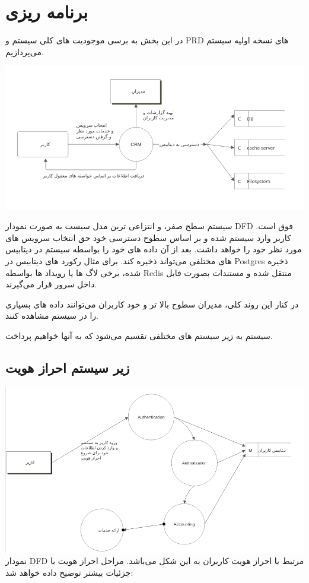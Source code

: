 \section{برنامه ریزی}
در این بخش به برسی موجودیت های کلی سیستم و PRD های نسخه اولیه سیستم می‌پردازیم.

\includegraphics[scale=0.8]{assets/0_level_system.png}

سیستم سطح صفر، و انتزاعی ترین مدل سیست به صورت نمودار DFD فوق است.
کاربر وارد سیستم شده و بر اساس سطوح دسترسی خود حق انتخاب سرویس های مورد نظر خود را خواهد داشت. بعد از آن
داده های خود را بواسطه سیستم در دیتابیس های مختلفی می‌تواند ذخیره کند.
برای مثال رکورد های دیتابیس در Postgres ذخیره شده، برخی لاگ ها یا رویداد ها بواسطه Redis منتقل شده و مستندات بصورت فایل داخل سرور قرار می‌گیرند.

در کنار این روند کلی، مدیران سطوح بالا تر و خود کاربران می‌توانند داده های بسیاری را در سیستم مشاهده کنند.

سیستم به زیر سیستم های مختلفی تقسیم می‌شود که به آنها خواهیم پرداخت.

\subsection{زیر سیستم احراز هویت}
\includegraphics[scale=0.8]{assets/auth_dfd.png}
نمودار DFD مرتبط با احراز هویت کاربران به این شکل می‌باشد.
مراحل احراز هویت با جزئیات بیشتر توضیح داده خواهد شد:


